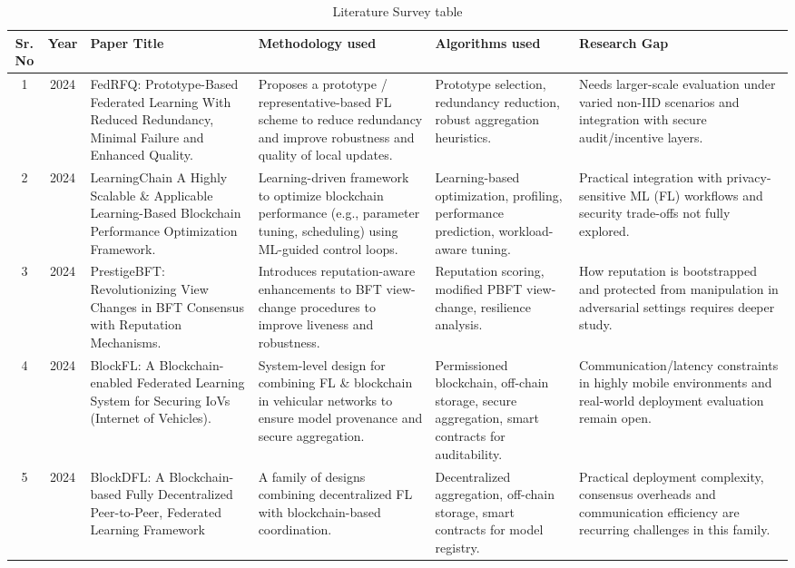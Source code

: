 \documentclass[12pt,a4paper]{article}
\begin{document}
\begin{table}[h]
\caption{Literature Survey table}
\footnotesize
\begin{tabularx}{\textwidth}{|c|c|X|X|X|X|}
\hline
\textbf{Sr. No} & \textbf{Year} & \textbf{Paper Title} & \textbf{Methodology used} & \textbf{Algorithms used} & \textbf{Research Gap} \\ \hline
1 & 2024 & FedRFQ: Prototype-Based Federated Learning With Reduced Redundancy, Minimal Failure and Enhanced Quality. & Proposes a prototype / representative-based FL scheme to reduce redundancy and improve robustness and quality of local updates. & Prototype selection, redundancy reduction, robust aggregation heuristics. & Needs larger-scale evaluation under varied non-IID scenarios and integration with secure audit/incentive layers. \\ \hline
2 & 2024 & LearningChain A Highly Scalable \& Applicable Learning-Based Blockchain Performance Optimization Framework. & Learning-driven framework to optimize blockchain performance (e.g., parameter tuning, scheduling) using ML-guided control loops. & Learning-based optimization, profiling, performance prediction, workload-aware tuning. & Practical integration with privacy-sensitive ML (FL) workflows and security trade-offs not fully explored. \\ \hline
3 & 2024 & PrestigeBFT: Revolutionizing View Changes in BFT Consensus with Reputation Mechanisms. & Introduces reputation-aware enhancements to BFT view-change procedures to improve liveness and robustness. & Reputation scoring, modified PBFT view-change, resilience analysis. & How reputation is bootstrapped and protected from manipulation in adversarial settings requires deeper study. \\ \hline
4 & 2024 & BlockFL: A Blockchain-enabled Federated Learning System for Securing IoVs (Internet of Vehicles). & System-level design for combining FL \& blockchain in vehicular networks to ensure model provenance and secure aggregation. & Permissioned blockchain, off-chain storage, secure aggregation, smart contracts for auditability. & Communication/latency constraints in highly mobile environments and real-world deployment evaluation remain open. \\ \hline
5 & 2024 & BlockDFL: A Blockchain-based Fully Decentralized Peer-to-Peer, Federated Learning Framework & A family of designs combining decentralized FL with blockchain-based coordination. & Decentralized aggregation, off-chain storage, smart contracts for model registry. & Practical deployment complexity, consensus overheads and communication efficiency are recurring challenges in this family. \\ \hline

\end{tabularx}
\end{table}
\end{document}
